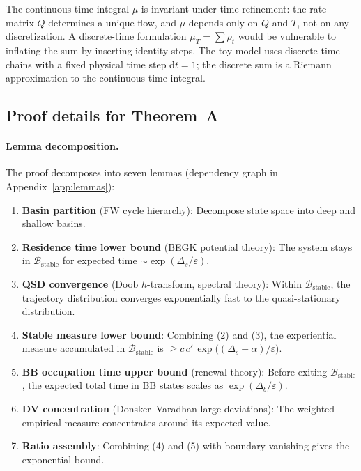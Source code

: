 \documentclass[12pt]{article}
\theoremstyle{remark}
\begin{document}
The continuous-time integral $\mu$ is invariant under time refinement: the rate matrix $Q$ determines a unique flow, and $\mu$ depends only on $Q$ and $T$, not on any discretization. A discrete-time formulation $\mu_T = \sum \rho_t$ would be vulnerable to inflating the sum by inserting identity steps. The toy model uses discrete-time chains with a fixed physical time step $\mathrm{d}t = 1$; the discrete sum is a Riemann approximation to the continuous-time integral.

\subsection{Proof details for Theorem~A}\label{app:proof-details}

\paragraph{Lemma decomposition.}
The proof decomposes into seven lemmas (dependency graph in Appendix~\ref{app:lemmas}):

\begin{enumerate}[leftmargin=2em]
\item \textbf{Basin partition} (FW cycle hierarchy): Decompose state space into deep and shallow basins.
\item \textbf{Residence time lower bound} (BEGK potential theory): The system stays in $\mathcal{B}_{\mathrm{stable}}$ for expected time $\sim \exp(\Delta_s/\varepsilon)$.
\item \textbf{QSD convergence} (Doob $h$-transform, spectral theory): Within $\mathcal{B}_{\mathrm{stable}}$, the trajectory distribution converges exponentially fast to the quasi-stationary distribution.
\item \textbf{Stable measure lower bound}: Combining (2) and (3), the experiential measure accumulated in $\mathcal{B}_{\mathrm{stable}}$ is $\geq c\,c'\,\exp\bigl((\Delta_s - \alpha)/\varepsilon\bigr)$.
\item \textbf{BB occupation time upper bound} (renewal theory): Before exiting $\mathcal{B}_{\mathrm{stable}}$, the expected total time in BB states scales as $\exp(\Delta_b/\varepsilon)$.
\item \textbf{DV concentration} (Donsker--Varadhan large deviations): The weighted empirical measure concentrates around its expected value.
\item \textbf{Ratio assembly}: Combining (4) and (5) with boundary vanishing gives the exponential bound.
\end{enumerate}
\end{document}

